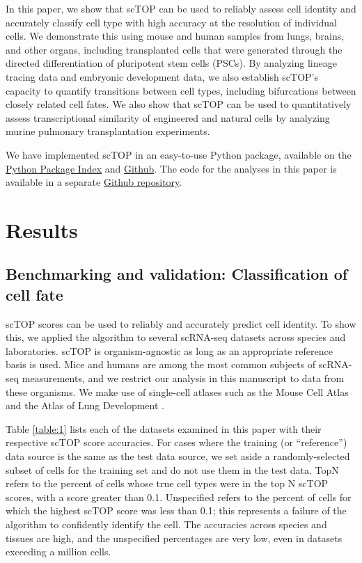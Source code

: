 \documentclass[vruler,JEB]{COB}%
\begin{document}
In this paper, we show that scTOP can be used to reliably assess cell identity and accurately classify cell type with high accuracy at the resolution of individual cells. We demonstrate this using mouse and human samples from lungs, brains, and other organs, including transplanted cells that were generated through the directed differentiation of pluripotent stem cells (PSCs). By analyzing lineage tracing data and embryonic development data, we also establish scTOP's capacity to quantify transitions between cell types, including bifurcations between closely related cell fates. We also show that scTOP can be used to quantitatively assess transcriptional similarity of engineered and natural cells by analyzing murine pulmonary transplantation experiments.

We have implemented scTOP in an easy-to-use Python package, available on the \href{https://pypi.org/project/scTOP/}{Python Package Index} and \href{https://github.com/Emergent-Behaviors-in-Biology/scTOP}{Github}. The code for the analyses in this paper is available in a separate \href{https://github.com/Emergent-Behaviors-in-Biology/scTOP-manuscript}{Github repository}.

\section{Results}
\subsection{Benchmarking and validation: Classification of cell fate}

scTOP scores can be used to reliably and accurately predict cell identity. To show this, we applied the algorithm to several scRNA-seq datasets across species and laboratories. scTOP is organism-agnostic as long as an appropriate reference basis is used. Mice and humans are among the most common subjects of scRNA-seq measurements, and we restrict our analysis in this manuscript to data from these organisms. We make use of single-cell atlases such as the Mouse Cell Atlas \citep{han2018mapping} and the Atlas of Lung Development \citep{negretti_single-cell_2021}.

Table \ref{table:1} lists each of the datasets examined in this paper with their respective scTOP score accuracies. For cases where the training (or ``reference'') data source is the same as the test data source, we set aside a randomly-selected subset of cells for the training set and do not use them in the test data. TopN refers to the percent of cells whose true cell types were in the top N scTOP scores, with a score greater than 0.1. Unspecified refers to the percent of cells for which the highest scTOP score was less than 0.1; this represents a failure of the algorithm to confidently identify the cell. The accuracies across species and tissues are high, and the unspecified percentages are very low, even in datasets exceeding a million cells.
\end{document}

